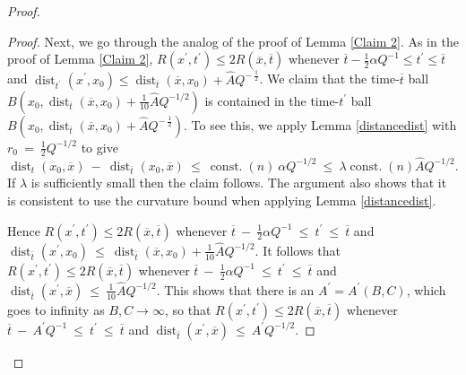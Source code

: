 \documentclass[12pt]{amsart}
\newcommand{\const}{\operatorname{const.}}
\newcommand{\dist}{\operatorname{dist}}
\numberwithin{equation}{section}
\theoremstyle{plain}
\theoremstyle{definition}
\theoremstyle{remark}
\begin{document}
\begin{proof}
\begin{proof}
Next, we go through the analog of the proof of Lemma \ref{Claim 2}.
As in the proof of Lemma \ref{Claim 2}, $R(x^\prime, t^\prime) \le 2
R(\overline{x}, \overline{t})$ whenever
$\overline{t}-\frac12 \alpha Q^{-1} \le t^\prime \le \overline{t}$
and $\dist_{t^\prime}(x^\prime, x_0) \le 
\dist_{\overline{t}}(\overline{x}, x_0) + \widehat{A} Q^{- \: \frac12}$. We
claim that the time-$\overline{t}$ ball
$B(x_0, \dist_{\overline{t}}(\overline{x}, x_0) + \frac{1}{10} \widehat{A}
Q^{-1/2})$ is contained in the time-$t^\prime$ ball
$B(x_0, \dist_{\overline{t}}(\overline{x}, x_0) + \widehat{A} Q^{- \: \frac12})$.
To see this, we apply Lemma \ref{distancedist} with
$r_0 \: = \: \frac{1}{2} Q^{-1/2}$ to give
\begin{equation}
\dist_t(x_0, \overline{x}) \: - \: 
\dist_{\overline{t}}(x_0, \overline{x}) \: \le \: \const(n) \:
\alpha Q^{-1/2} \: \le \: \lambda \const(n) \widehat{A} Q^{-1/2}.
\end{equation}
If $\lambda$ is sufficiently small then the claim follows. The argument
also shows that it is consistent to use the curvature bound when
applying Lemma \ref{distancedist}.

Hence $R(x^\prime, t^\prime) \le 2
R(\overline{x}, \overline{t})$ whenever
$\overline{t} \: - \: \frac{1}{2}  \alpha 
Q^{-1} \: \le \: t^\prime \: \le \: \overline{t}$ and
$\dist_{\overline{t}}(x^\prime, x_0) \: \le \:
\dist_{\overline{t}}(\overline{x}, x_0) + \frac{1}{10} \widehat{A}
Q^{-1/2}$. It follows that 
$R(x^\prime, t^\prime) \le 2
R(\overline{x}, \overline{t})$ whenever
$\overline{t} \: - \: \frac{1}{2}  \alpha 
Q^{-1} \: \le \: t^\prime \: \le \: \overline{t}$ and
$\dist_{\overline{t}}(x^\prime, \overline{x}) \: \le \: \frac{1}{10} 
\widehat{A} Q^{-1/2}$. This shows that there is an $A^\prime = A^\prime
(B, C)$, which goes
to infinity as $B, C \rightarrow \infty$, so that
$R(x^\prime, t^\prime) \le 2
R(\overline{x}, \overline{t})$ whenever
$\overline{t} \: - \: A^\prime
Q^{-1} \: \le \: t^\prime \: \le \: \overline{t}$ and
$\dist_{\overline{t}}(x^\prime, \overline{x}) \: \le \: A^\prime
Q^{-1/2}$.


\end{proof}
\end{proof}
\end{document}
